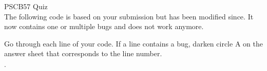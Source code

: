 \documentclass{article}
\begin{document}
\noindent
{\huge PSCB57 Quiz}\\[1pt]

\noindent
The following code is based on your submission but has been modified since.
It now contains one or multiple bugs and does not work anymore.

Go through each line of your code. If a line contains a bug, darken circle A on the answer sheet that corresponds to the line number.
 

\newpage
$.$
\end{document}
